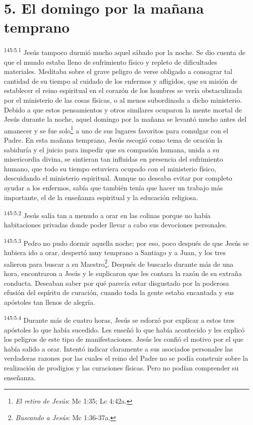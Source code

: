 \section*{5. El domingo por la mañana temprano}
\par 
\textsuperscript{145:5.1} Jesús tampoco durmió mucho aquel sábado por la noche. Se dio cuenta de que el mundo estaba lleno de sufrimiento físico y repleto de dificultades materiales. Meditaba sobre el grave peligro de verse obligado a consagrar tal cantidad de su tiempo al cuidado de los enfermos y afligidos, que su misión de establecer el reino espiritual en el corazón de los hombres se vería obstaculizada por el ministerio de las cosas físicas, o al menos subordinada a dicho ministerio. Debido a que estos pensamientos y otros similares ocuparon la mente mortal de Jesús durante la noche, aquel domingo por la mañana se levantó mucho antes del amanecer y se fue solo\footnote{\textit{El retiro de Jesús}: Mc 1:35; Lc 4:42a.} a uno de sus lugares favoritos para comulgar con el Padre. En esta mañana temprano, Jesús escogió como tema de oración la sabiduría y el juicio para impedir que su compasión humana, unida a su misericordia divina, se sintieran tan influidas en presencia del sufrimiento humano, que todo su tiempo estuviera ocupado con el ministerio físico, descuidando el ministerio espiritual. Aunque no deseaba evitar por completo ayudar a los enfermos, sabía que también tenía que hacer un trabajo más importante, el de la enseñanza espiritual y la educación religiosa.

\par 
\textsuperscript{145:5.2} Jesús salía tan a menudo a orar en las colinas porque no había habitaciones privadas donde poder llevar a cabo sus devociones personales.

\par 
\textsuperscript{145:5.3} Pedro no pudo dormir aquella noche; por eso, poco después de que Jesús se hubiera ido a orar, despertó muy temprano a Santiago y a Juan, y los tres salieron para buscar a su Maestro\footnote{\textit{Buscando a Jesús}: Mc 1:36-37a.}. Después de buscarlo durante más de una hora, encontraron a Jesús y le suplicaron que les contara la razón de su extraña conducta. Deseaban saber por qué parecía estar disgustado por la poderosa efusión del espíritu de curación, cuando toda la gente estaba encantada y sus apóstoles tan llenos de alegría.

\par 
\textsuperscript{145:5.4} Durante más de cuatro horas, Jesús se esforzó por explicar a estos tres apóstoles lo que había sucedido. Les enseñó lo que había acontecido y les explicó los peligros de este tipo de manifestaciones. Jesús les confió el motivo por el que había salido a orar. Intentó indicar claramente a sus asociados personales las verdaderas razones por las cuales el reino del Padre no se podía construir sobre la realización de prodigios y las curaciones físicas. Pero no podían comprender su enseñanza.


